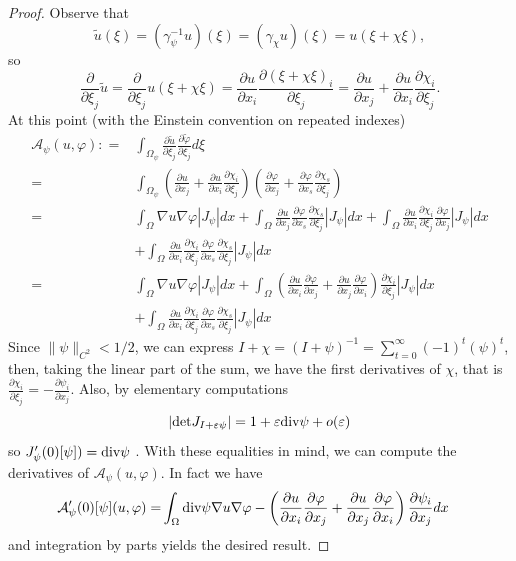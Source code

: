 \documentclass[a4paper,reqno,11pt,oneside]{amsart}
\theoremstyle{plain}
\theoremstyle{plain}
\theoremstyle{plain}
\theoremstyle{remark}
\def\div{\textup{div}}
\begin{document}
\begin{proof}
Observe that
\begin{displaymath}
    \tilde u(\xi)=(\gamma_\psi^{-1} u)(\xi)=(\gamma_\chi u)(\xi) =u(\xi +\chi \xi), 
\end{displaymath}
so 
$$
\frac{\partial }{\partial \xi_j}\tilde u=\frac{\partial }{\partial \xi_j}u(\xi +\chi \xi)=
\frac{\partial u}{\partial x_i}
\frac{\partial (\xi +\chi \xi)_i}{ \partial \xi_j}
=\frac{\partial u}{\partial x_j}+
\frac{\partial u}{\partial x_i}\frac{\partial \chi_i}{ \partial \xi_j}.
$$
At this point (with the Einstein convention on repeated indexes)
\begin{align*}
\mathcal{A}_\psi(u,\varphi):
=&
\int_{\Omega_\psi} \frac{\partial \tilde u }{\partial \xi_j}\frac{\partial \tilde \varphi }{\partial \xi_j}d\xi\\
=&\int_{\Omega_\psi} 
\left(
\frac{\partial u}{\partial x_j}+
\frac{\partial u}{\partial x_i}\frac{\partial \chi_i}{ \partial \xi_j}
\right)
\left(
\frac{\partial \varphi}{\partial x_j}+
\frac{\partial \varphi}{\partial x_s}\frac{\partial \chi_s}{ \partial \xi_j}
\right)\\
=&\int_\Omega \nabla u \nabla \varphi |J_\psi| dx+
\int_\Omega \frac{\partial u}{\partial x_j}
\frac{\partial \varphi}{\partial x_s}\frac{\partial \chi_s}{ \partial \xi_j}
|J_\psi| dx
+\int_\Omega \frac{\partial u}{\partial x_i}\frac{\partial \chi_i}{ \partial \xi_j}\frac{\partial \varphi}{\partial x_j}|J_\psi| dx\\
&+\int_\Omega \frac{\partial u}{\partial x_i}\frac{\partial \chi_i}{ \partial \xi_j}
\frac{\partial \varphi}{\partial x_s}\frac{\partial \chi_s}{ \partial \xi_j}
|J_\psi| dx\\
=&\int_\Omega \nabla u \nabla \varphi |J_\psi| dx+
\int_\Omega 
\left(\frac{\partial u}{\partial x_i}\frac{\partial \varphi}{\partial x_j}+
\frac{\partial u}{\partial x_j}\frac{\partial \varphi}{\partial x_i}
\right)\frac{\partial \chi_i}{ \partial \xi_j}
|J_\psi| dx\\
&+\int_\Omega \frac{\partial u}{\partial x_i}\frac{\partial \chi_i}{ \partial \xi_j}
\frac{\partial \varphi}{\partial x_s}\frac{\partial \chi_s}{ \partial \xi_j}
|J_\psi| dx
\end{align*}
Since $\|\psi\|_{C^2}<1/2$, we can express $I+\chi=(I+\psi)^{-1}=\sum_{t=0}^\infty (-1)^t(\psi)^t$, then, taking the linear part of the sum, we have the first derivatives of $\chi$, that is $\frac {\partial \chi_i}{\partial \xi_j} =-\frac {\partial \psi_i}{\partial x_j}$.
Also, by elementary computations
$$
|\mathrm{det}J_{I+\varepsilon \psi}|=1+\varepsilon \div\psi +o(\varepsilon)
$$
so $J_\psi'(0)[\psi])=\div\psi$ . With these equalities in mind, we can compute the derivatives of $\mathcal{A}_\psi(u,\varphi)$. In fact we have
\begin{eqnarray*}
    \mathcal{A}'_\psi(0)[\psi](u,\varphi)=&\int_\Omega\div\psi \nabla u\nabla \varphi - \left(\frac{\partial u}{\partial x_i}\frac{\partial \varphi}{\partial x_j}+
\frac{\partial u}{\partial x_j}\frac{\partial \varphi}{\partial x_i}
\right)\frac{\partial \psi_i}{ \partial x_j}dx
\end{eqnarray*} 
and integration by parts yields the desired result.
\end{proof}
\end{document}
